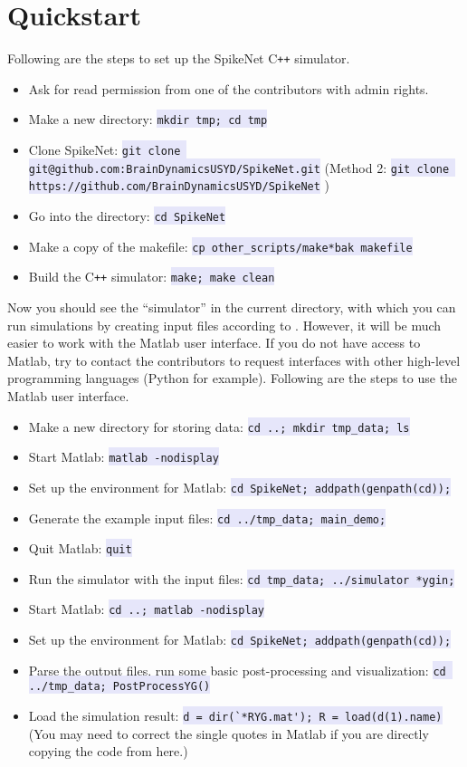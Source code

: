 \documentclass{article}
\newcommand{\mylstinline}[1] {\colorbox{Lavender}{\lstinline[basicstyle=\ttfamily\footnotesize\color{Black}]|#1|} }
\begin{document}
\section{Quickstart}
Following are the steps to set up the SpikeNet C\texttt{++} simulator.
\begin{itemize}
\item Ask for read permission from one of the contributors with admin rights.
\item Make a new directory: \mylstinline{mkdir tmp; cd tmp}
\item Clone SpikeNet: \mylstinline{git clone git@github.com:BrainDynamicsUSYD/SpikeNet.git}
\newline (Method 2: \mylstinline{git clone https://github.com/BrainDynamicsUSYD/SpikeNet})

\item Go into the directory: \mylstinline{cd SpikeNet}
\item Make a copy of the makefile: \mylstinline{cp other_scripts/make*bak makefile}
\item Build the C\texttt{++} simulator:  \mylstinline{make; make clean}
\end{itemize}

Now you should see the ``simulator'' in the current directory, with which you can run simulations by creating input files according to .
However, it will be much easier to work with the Matlab user interface.
If you do not have access to Matlab, try to contact the contributors to request interfaces with other high-level programming languages (Python for example).
Following are the steps to use the Matlab user interface.
\begin{itemize}
\item Make a new directory for storing data: \mylstinline{cd ..; mkdir tmp_data; ls}
\item Start Matlab: \mylstinline{matlab -nodisplay}
\item Set up the environment for Matlab: \mylstinline{cd SpikeNet; addpath(genpath(cd));}
\item Generate the example input files: \mylstinline{cd ../tmp_data; main_demo;}
\item Quit Matlab: \mylstinline{quit}
\item Run the simulator with the input files: \mylstinline{cd tmp_data; ../simulator *ygin;}
\item Start Matlab: \mylstinline{cd ..; matlab -nodisplay}
\item Set up the environment for Matlab: \mylstinline{cd SpikeNet; addpath(genpath(cd));}
\item Parse the output files, run some basic post-processing and visualization: 
\newline \mylstinline{cd ../tmp_data; PostProcessYG()}
\item Load the simulation result: \mylstinline{d = dir(`*RYG.mat'); R = load(d(1).name)} (You may need to correct the single quotes in Matlab if you are directly copying the code from here.)
\end{itemize}
\end{document}
